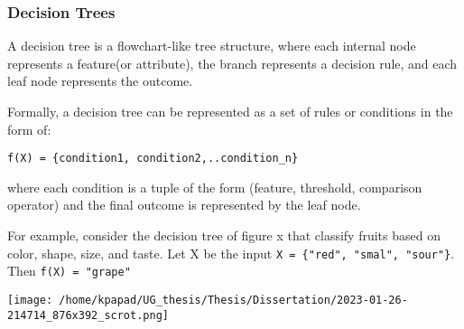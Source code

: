 \subsubsection{Decision Trees}
\label{sec:orgc68262f}
A decision tree is a flowchart-like tree structure, where each internal node represents a feature(or attribute), the branch represents a decision rule, and each leaf node represents the outcome.

Formally, a decision tree can be represented as a set of rules or conditions in the form of:

\texttt{f(X) = \{condition1, condition2,..condition\_n\}}

where each condition is a tuple of the form (feature, threshold, comparison operator) and the final outcome is represented by the leaf node.

For example, consider the decision tree of figure x that classify fruits based on color, shape, size, and taste. Let X be the input \texttt{X = \{"red", "smal", "sour"\}}. Then \texttt{f(X) = "grape"} 
\begin{center}
\texttt{[image: /home/kpapad/UG\_thesis/Thesis/Dissertation/2023-01-26-214714\_876x392\_scrot.png]}
\end{center} 

